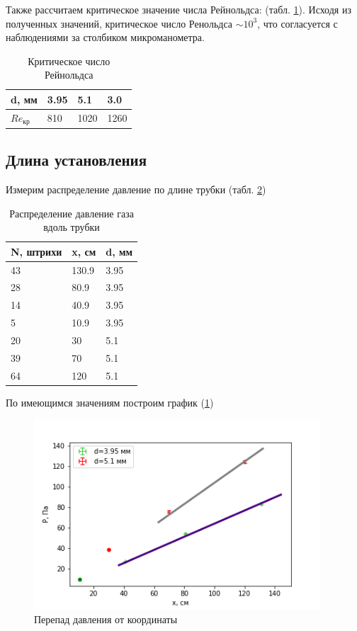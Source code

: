\documentclass[a4paper,12pt]{article} %
\begin{document}
Также рассчитаем критическое значение числа Рейнольдса: (табл. \ref{Критическое}). Исходя из полученных значений, критическое число Ренольдса $\sim 10^3$, что согласуется с наблюдениями за столбиком микроманометра.
\begin{table}[h!]
\caption{Критическое число Рейнольдса}
\label{Критическое}
\begin{tabular}{|l|l|l|l|}
\hline
d, мм     & 3.95 & 5.1  & 3.0  \\ \hline
$Re_{кр}$ & 810  & 1020 & 1260 \\ \hline
\end{tabular}
\end{table}

\subsection{Длина установления}
Измерим распределение давление по длине трубки (табл. \ref{распределение})
\begin{table}[h!]
\caption{Распределение давление газа вдоль трубки}
\label{распределение}
\begin{tabular}{|l|l|l|}
\hline
N, штрихи  & x, см     & d, мм    \\ \hline
43 & 130.9 & 3.95 \\ \hline
28 & 80.9  & 3.95 \\ \hline
14 & 40.9  & 3.95 \\ \hline
5  & 10.9  & 3.95 \\ \hline
20 & 30    & 5.1  \\ \hline
39 & 70    & 5.1  \\ \hline
64 & 120   & 5.1  \\ \hline
\end{tabular}
\end{table}
По имеющимся значениям построим график (\ref{P(x)_pic})
\begin{figure}[h!]
\begin{center}
\includegraphics[width=0.95\textwidth]{P(x)}
\end{center}
\caption{Перепад давления от координаты} \label{P(x)_pic}
\end{figure}
\end{document}

